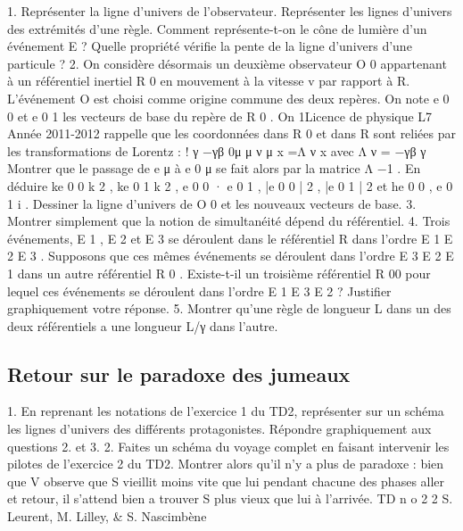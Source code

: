 1. Représenter la ligne d’univers de l’observateur. Représenter les lignes d’univers des extrémités d’une règle. Comment représente-t-on le cône de lumière d’un événement E ?
Quelle propriété vérifie la pente de la ligne d’univers d’une particule ?
2. On considère désormais un deuxième observateur O 0 appartenant à un référentiel inertiel
R 0 en mouvement à la vitesse v par rapport à R. L’événement O est choisi comme origine
commune des deux repères. On note e 0 0 et e 0 1 les vecteurs de base du repère de R 0 . On
1Licence de physique
L7
Année 2011-2012
rappelle que les coordonnées dans R 0 et dans R sont reliées par les transformations de
Lorentz :
!
γ
−γβ
0μ
μ
ν
μ
x =Λ ν x
avec Λ ν =
−γβ
γ
Montrer que le passage de e μ à e 0 μ se fait alors par la matrice Λ −1 . En déduire ke 0 0 k 2 ,
ke 0 1 k 2 , e 0 0 · e 0 1 , |e 0 0 | 2 , |e 0 1 | 2 et he 0 0 , e 0 1 i . Dessiner la ligne d’univers de O 0 et les nouveaux
vecteurs de base.
3. Montrer simplement que la notion de simultanéité dépend du référentiel.
4. Trois événements, E 1 , E 2 et E 3 se déroulent dans le référentiel R dans l’ordre E 1 E 2 E 3 . Supposons que ces mêmes événements se déroulent dans l’ordre E 3 E 2 E 1 dans un autre référentiel R 0 . Existe-t-il un troisième référentiel R 00 pour lequel ces événements se déroulent dans
l’ordre E 1 E 3 E 2 ? Justifier graphiquement votre réponse.
5. Montrer qu’une règle de longueur L dans un des deux référentiels a une longueur L/γ dans
l’autre.
\subsection{Retour sur le paradoxe des jumeaux}%
1. En reprenant les notations de l’exercice 1 du TD2, représenter sur un schéma les lignes
d’univers des différents protagonistes. Répondre graphiquement aux questions 2. et 3.
2. Faites un schéma du voyage complet en faisant intervenir les pilotes de l’exercice 2 du
TD2. Montrer alors qu’il n’y a plus de paradoxe : bien que V observe que S vieillit moins
vite que lui pendant chacune des phases aller et retour, il s’attend bien a trouver S plus
vieux que lui à l’arrivée.
TD n o 2
2
S. Leurent, M. Lilley, & S. Nascimbène
